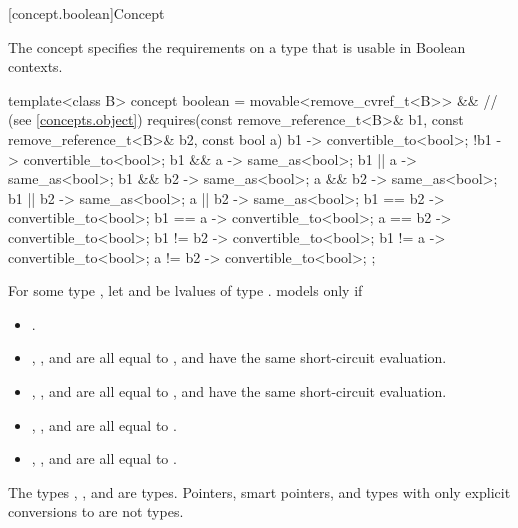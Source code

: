 [concept.boolean]{Concept }

\pnum
The  concept specifies the requirements on a type that is
usable in Boolean contexts.

%
\begin{itemdecl}
template<class B>
  concept boolean =
    movable<remove_cvref_t<B>> && // (see \ref{concepts.object})
    requires(const remove_reference_t<B>& b1,
             const remove_reference_t<B>& b2, const bool a) {
      { b1 } -> convertible_to<bool>;
      { !b1 } -> convertible_to<bool>;
      { b1 &&  a } -> same_as<bool>;
      { b1 ||  a } -> same_as<bool>;
      { b1 && b2 } -> same_as<bool>;
      {  a && b2 } -> same_as<bool>;
      { b1 || b2 } -> same_as<bool>;
      {  a || b2 } -> same_as<bool>;
      { b1 == b2 } -> convertible_to<bool>;
      { b1 ==  a } -> convertible_to<bool>;
      {  a == b2 } -> convertible_to<bool>;
      { b1 != b2 } -> convertible_to<bool>;
      { b1 !=  a } -> convertible_to<bool>;
      {  a != b2 } -> convertible_to<bool>;
    };
\end{itemdecl}

\pnum
For some type , let  and  be
lvalues of type .
 models  only if

\begin{itemize}
\item {}.
\item {}, , and
       are all equal to
      , and have the same short-circuit
      evaluation.
\item {}, , and
       are all equal to
      , and have the same short-circuit
      evaluation.
\item {}, , and
       are all equal to
      .
\item {}, , and
       are all equal to
      .
\end{itemize}

\pnum
\begin{example}
The types , , and
 are 
types. Pointers, smart pointers, and types with only explicit conversions to
 are not  types.
\end{example}


